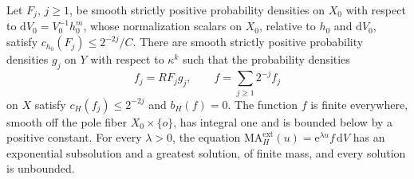 \begin{theorem}\label{thm:zero-threshold-solvable-concentration}
Let $F_j$, $j\geq1$, be smooth strictly positive probability densities on $X_0$ with respect to $\mathrm dV_0=V_0^{-1}h_0^m$, whose normalization scalars on $X_0$, relative to $h_0$ and $\mathrm dV_0$, satisfy $c_{h_0}(F_j)\leq2^{-2j}/C$. There are smooth strictly positive probability densities $g_j$ on $Y$ with respect to $\kappa^k$ such that the probability densities
\[
 f_j=RF_jg_j,\qquad f=\sum_{j\geq1}2^{-j}f_j
\]
on $X$ satisfy $c_H(f_j)\leq2^{-2j}$ and $b_H(f)=0$. The function $f$ is finite everywhere, smooth off the pole fiber $X_0\times\{o\}$, has integral one and is bounded below by a positive constant. For every $\lambda>0$, the equation $\mathrm{MA}^{\mathrm{ext}}_H(u)=\mathrm{e}^{\lambda u}f\,\mathrm{d}V$ has an exponential subsolution and a greatest solution, of finite mass, and every solution is unbounded.
\end{theorem}
